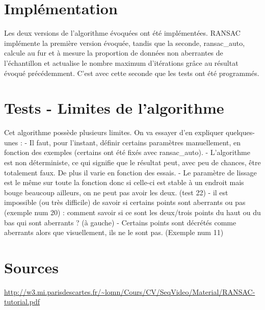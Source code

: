 \documentclass[a4paper,12pt]{article} %
\begin{document}
\section{Implémentation}
Les deux versions de l'algorithme évoquées ont été implémentées. RANSAC implémente la première version évoquée, tandis que la seconde, ransac\_auto, calcule au fur et à mesure la proportion de données non aberrantes de l'échantillon et actualise le nombre maximum d'itérations grâce au résultat évoqué précédemment.
C'est avec cette seconde que les tests ont été programmés.

\section{Tests - Limites de l'algorithme}
Cet algorithme possède plusieurs limites. On va essayer d'en expliquer quelques-unes :
- Il faut, pour l'instant, définir certains paramètres manuellement, en fonction des exemples (certains ont été fixés avec ransac\_auto). 
- L'algorithme est non déterministe, ce qui signifie que le résultat peut, avec peu de chances, être totalement faux. De plus il varie en fonction des essais.
- Le paramètre de lissage est le même sur toute la fonction donc si celle-ci est stable à un endroit mais bouge beaucoup ailleurs, on ne peut pas avoir les deux. (test 22)
- il est impossible (ou très difficile) de savoir si certains points sont aberrants ou pas (exemple num 20) : comment savoir si ce sont les deux/trois points du haut ou du bas qui sont aberrants ? (à gauche)
- Certains points sont décrétés comme aberrants alors que visuellement, ils ne le sont pas. (Exemple num 11)


\section{Sources}
\url{http://w3.mi.parisdescartes.fr/~lomn/Cours/CV/SeqVideo/Material/RANSAC-tutorial.pdf} \\

\begin{figure}
\begin{center}
\end{center}
\end{figure}
\end{document}

